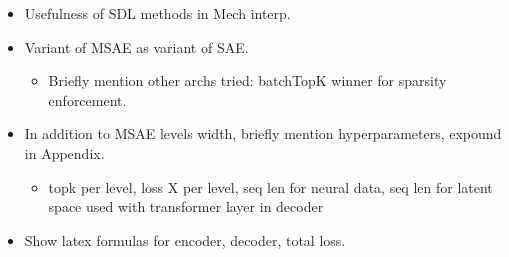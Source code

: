 \begin{itemize}
    \item Usefulness of SDL methods in Mech interp.
    
    \item Variant of MSAE as variant of SAE.
    \begin{itemize}
        \item Briefly mention other archs tried: batchTopK winner for sparsity enforcement.
    \end{itemize}
    
    \item In addition to MSAE levels width, briefly mention hyperparameters, expound in Appendix.
    \begin{itemize}
        \item topk per level, loss X per level, seq len for neural data, seq len for latent space used with transformer layer in decoder
    \end{itemize}
    
    \item Show latex formulas for encoder, decoder, total loss.
\end{itemize}